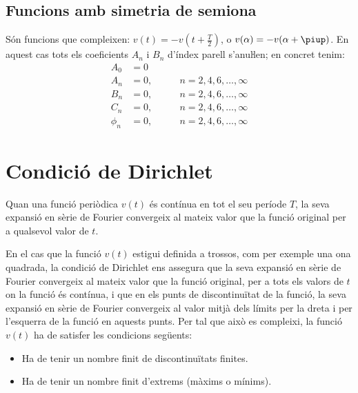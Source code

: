 \subsection{Funcions amb simetria de semiona}

Són funcions que compleixen: $v(t) = -v(t+\frac{T}{2})$, o $v(\alpha) = -v(\alpha+\piup)$. En aquest
cas tots els coeficients $A_n$ i $B_n$ d'índex parell s'anuŀlen;
en concret tenim:
\begin{subequations}
\begin{alignat}{2}
    A_0 &= 0       & \\[0.5ex]
    A_n &= 0,       &\qquad n = 2,4,6,\ldots,\infty\\[0.5ex]
    B_n &= 0,      &\qquad n = 2,4,6,\ldots,\infty\\[0.5ex]
    C_n &= 0,       &\qquad n = 2,4,6,\ldots,\infty\\[0.5ex]
    \phi_n &= 0, &\qquad n = 2,4,6,\ldots,\infty
\end{alignat}
\end{subequations}

\section{Condició de Dirichlet}

Quan una funció periòdica $v(t)$  és contínua en tot el seu període
$T$, la seva expansió en sèrie de Fourier convergeix al mateix valor
que la funció original per a qualsevol valor de $t$.

En el cas que la funció $v(t)$ estigui definida a trossos, com per
exemple una ona quadrada, la condició de Dirichlet ens assegura que
la seva expansió en sèrie de Fourier convergeix al mateix valor que
la funció original, per a tots els valors de $t$ on la funció és
contínua, i que en els punts de discontinuïtat de la funció, la seva
expansió en sèrie de Fourier convergeix al valor mitjà dels límits
per la dreta i per l'esquerra de la funció en aquests punts. Per tal
que això es compleixi, la funció $v(t)$ ha de satisfer les condicions
següents:
\begin{itemize}
   \item Ha de tenir un nombre finit de discontinuïtats
   finites.
   \item Ha de tenir un nombre finit d'extrems (màxims o mínims).
\end{itemize}

